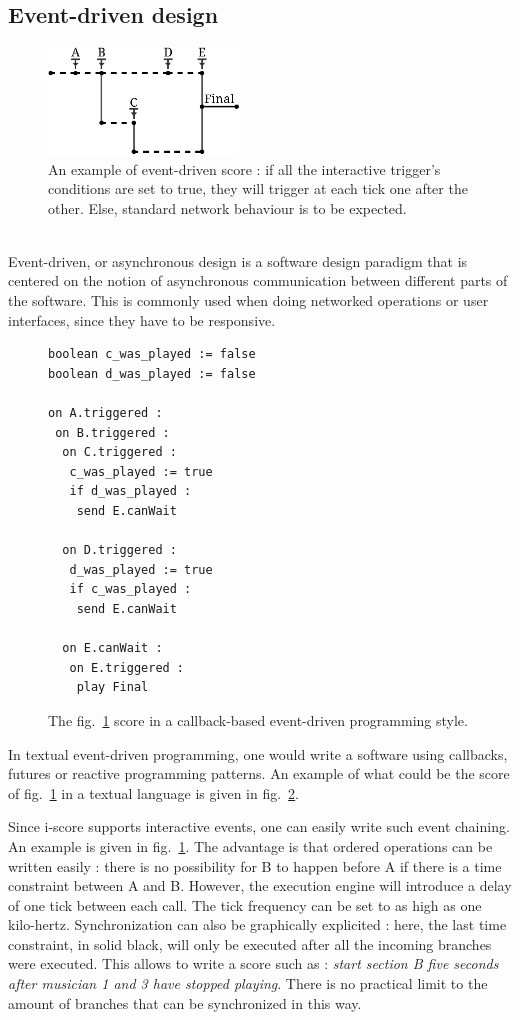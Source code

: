 \documentclass{article}
\begin{document}
\subsection{Event-driven design}
\begin{figure}[h]
    \centering
    \includegraphics[width=0.45\textwidth]{images/event.eps}
    \caption{An example of event-driven score : if all the interactive trigger's conditions are set to true, they will trigger at each tick one after the other. Else, standard network behaviour is to be expected.}
    \label{fig.event}
\end{figure}~\\
Event-driven, or asynchronous design is a software design 
paradigm that is centered on the notion of asynchronous 
communication between different parts of the software.
This is commonly used when doing networked operations or 
user interfaces, since they have to be responsive.

\begin{figure}[h]
\begin{lstlisting}[language=Algol]
boolean c_was_played := false
boolean d_was_played := false
  
on A.triggered :
 on B.triggered :
  on C.triggered :
   c_was_played := true
   if d_was_played :
    send E.canWait

  on D.triggered :
   d_was_played := true
   if c_was_played :
    send E.canWait
  
  on E.canWait :
   on E.triggered :
    play Final
\end{lstlisting}
\caption{The fig.~\ref{fig.event} score in a callback-based event-driven programming style.}
\label{fig.eventdriven}
\end{figure}

In textual event-driven programming, one would write a software 
using callbacks, futures or reactive programming patterns\cite{kambona2013evaluation}. 
An example of what could be the score of fig.~\ref{fig.event} in a textual language is given in fig.~\ref{fig.eventdriven}.

Since i-score supports interactive events, one can easily write such event chaining.
An example is given in fig.~\ref{fig.event}. 
The advantage is that ordered operations can be written easily : there is no 
possibility for B to happen before A if there is a time constraint between A and B.
However, the execution engine will introduce a delay of one tick between each call.
The tick frequency can be set to as high as one kilo-hertz.
Synchronization can also be graphically explicited : here, the last time constraint, in solid black, will 
only be executed after all the incoming branches were executed. 
This allows to write a score such as : \emph{start section B five seconds after musician 1 and 3 
have stopped playing}.
There is no practical limit to the amount of branches that can be synchronized in this way.
\end{document}
